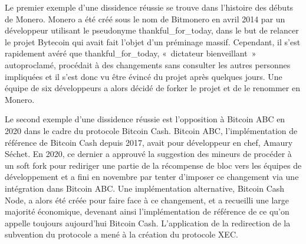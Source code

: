 Le premier exemple d'une dissidence réussie se trouve dans l'histoire des débuts de Monero. Monero a été créé sous le nom de Bitmonero en avril 2014 par un développeur utilisant le pseudonyme thankful\_for\_today, dans le but de relancer le projet Bytecoin qui avait fait l'objet d'un préminage massif. Cependant, il s'est rapidement avéré que thankful\_for\_today, «~dictateur bienveillant~» autoproclamé, procédait à des changements sans consulter les autres personnes impliquées et il s'est donc vu être évincé du projet après quelques jours. Une équipe de six développeurs a alors décidé de forker le projet et de le renommer en Monero.

Le second exemple d'une dissidence réussie est l'opposition à Bitcoin ABC en 2020 dans le cadre du protocole Bitcoin Cash. Bitcoin ABC, l'implémentation de référence de Bitcoin Cash depuis 2017, avait pour développeur en chef, Amaury Séchet. En 2020, ce dernier a approuvé la suggestion des mineurs de procéder à un soft fork pour rediriger une partie de la récompense de bloc vers les équipes de développement et a fini en novembre par tenter d'imposer ce changement via une intégration dans Bitcoin ABC. Une implémentation alternative, Bitcoin Cash Node, a alors été créée pour faire face à ce changement, et a recueilli une large majorité économique, devenant ainsi l'implémentation de référence de ce qu'on appelle toujours aujourd'hui Bitcoin Cash. L'application de la redirection de la subvention du protocole a mené à la création du protocole XEC.

